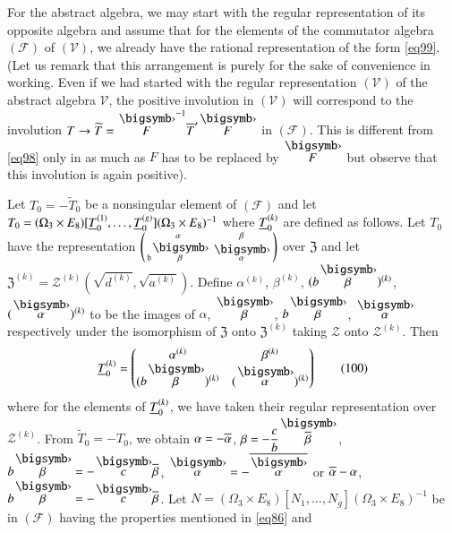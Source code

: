 For the abstract algebra, we may start with the regular representation
of its opposite algebra and assume that for the elements of the
commutator algebra $(\mathscr{F})$ of $(\mathscr{V})$, we already have
the rational representation of the form \eqref{eq99}. (Let us remark
that this arrangement is purely for the sake of convenience in
working. Even if we had started with the regular representation
$(\mathscr{V})$ of the abstract algebra $\mathscr{V}$, the positive
involution in $(\mathscr{V})$ will correspond to the involution $T\to
\widetilde{T}=\overdot{F}^{-1}\ob{T}'\overdot{F}$ in
$(\mathscr{F})$. This is different from \eqref{eq98} only in as much as
$F$ has to be replaced by $\overdot{F}$ but observe that this
involution is again positive).

Let $T_{0}=-\widetilde{T}_{0}$ be a nonsingular element of
$(\mathscr{F})$ and let $T_{0}=(\Omega_{3}\times
E_{8})[\underline{T}^{(1)}_{0},\ldots,\underline{T}_{0}^{(g)}](\Omega_{3}\times
E_{8})^{-1}$ where $\underline{T}_{0}^{(k)}$ are defined as follows. Let
$T_{0}$ have the representation $\left(\begin{smallmatrix}\alpha &
  \beta\\ \mathfrak{b}\overdot{\beta} & \overdot{\alpha}
\end{smallmatrix}\right)$ over $\mathfrak{Z}$ and let
$\mathfrak{Z}^{(k)}=\mathscr{Z}^{(k)}(\sqrt{d^{(k)}} ,
\sqrt{a^{(k)}})$. Define 
$\alpha^{(k)}$, $\beta^{(k)}$, $(b\overdot{\beta})^{(k)}$,
$(\overdot{\alpha})^{(k)}$ to be the images of $\alpha$, $\overdot{\beta}$,
$b\overdot{\beta}$, $\overdot{\alpha}$ respectively under the
isomorphism of $\mathfrak{Z}$ onto $\mathfrak{Z}^{(k)}$ taking
$\mathscr{Z}$ onto $\mathscr{Z}^{(k)}$. Then 
\begin{equation*}
\ub{T}^{(k)}_{0}=
\begin{pmatrix}
\alpha^{(k)} & \beta^{(k)}\\
(b\overdot{\beta})^{(k)} & (\overdot{\alpha})^{(k)}
\end{pmatrix}\tag{100}\label{eq100}
\end{equation*}
where for the elements of $\underline{T}_{0}^{(k)}$, we have taken their
regular representation over $\mathscr{Z}^{(k)}$. From
$\widetilde{T}_{0}=-T_{0}$, we obtain $\alpha=-\overline{\alpha}$,
$\beta=-\dfrac{c}{b}\overdot{\ob{\beta}}$,
$b\overdot{\beta}=-\overdot{c}\ob{\beta}$,
$\overdot{\alpha}=-\ob{\overdot{\alpha}}$ or $\overline{\alpha}-\alpha$,
$b\overdot{\beta}=-\overdot{c}\ob{\beta}$. Let $N=(\Omega_{3}\times
E_{8})[N_{1},\ldots,N_{g}](\Omega_{3}\times E_{8})^{-1}$ be in
$(\mathscr{F})$ having the properties mentioned in \eqref{eq86} and

